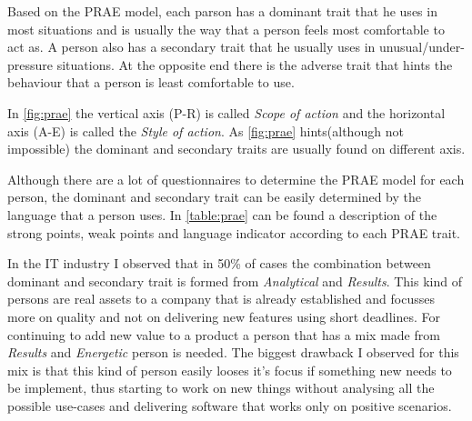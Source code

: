 Based on the PRAE model, each parson has a dominant trait that he uses in most situations and is usually the way that a person feels most comfortable to act as. A person also has a secondary trait that he usually uses in unusual/under-pressure situations. At the opposite end there is the adverse trait that hints the behaviour that a person is least comfortable to use.

In \ref{fig:prae} the vertical axis (P-R) is called \textit{Scope of action} and the horizontal axis (A-E) is called the \textit{Style of action}. As \ref{fig:prae} hints(although not impossible) the dominant and secondary traits are usually found on different axis. 

Although there are a lot of questionnaires to determine the PRAE model for each person, the dominant and secondary trait can be easily determined by the language that a person uses. In \ref{table:prae} can be found a description of the strong points, weak points and language indicator according to each PRAE trait.

In the IT industry I observed that in 50\% of cases the combination between dominant and secondary trait is formed from \textit{Analytical} and \textit{Results}. This kind of persons are real assets to a company that is already established and focusses more on quality and not on delivering new features using short deadlines. For continuing to add new value to a product a person that has a mix made from \textit{Results} and \textit{Energetic} person is needed. The biggest drawback I observed for this mix is that this kind of person easily looses it's focus if something new needs to be implement, thus starting to work on new things without analysing all the possible use-cases and delivering software that works only on positive scenarios.

